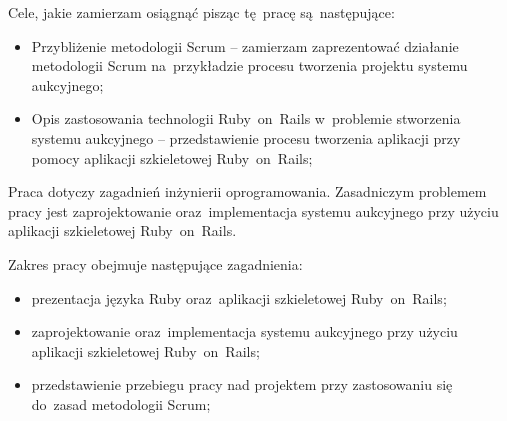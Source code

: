 Cele, jakie zamierzam osiągnąć pisząc tę~pracę są~następujące:

\begin{itemize}
  \item Przybliżenie metodologii Scrum -- zamierzam zaprezentować działanie metodologii Scrum na~przykładzie procesu tworzenia projektu systemu aukcyjnego;
  \item Opis zastosowania technologii Ruby~on~Rails w~problemie stworzenia systemu aukcyjnego -- przedstawienie procesu tworzenia aplikacji przy pomocy aplikacji szkieletowej Ruby~on~Rails;
\end{itemize}

Praca dotyczy zagadnień inżynierii oprogramowania. Zasadniczym problemem pracy jest zaprojektowanie oraz~implementacja systemu aukcyjnego przy użyciu aplikacji szkieletowej Ruby~on~Rails.

Zakres pracy obejmuje następujące zagadnienia:

\begin{itemize}
  \item prezentacja języka Ruby oraz~aplikacji szkieletowej Ruby~on~Rails;
  \item zaprojektowanie oraz~implementacja systemu aukcyjnego przy użyciu aplikacji szkieletowej Ruby~on~Rails;
  \item przedstawienie przebiegu pracy nad projektem przy zastosowaniu się do~zasad metodologii Scrum;
\end{itemize}
